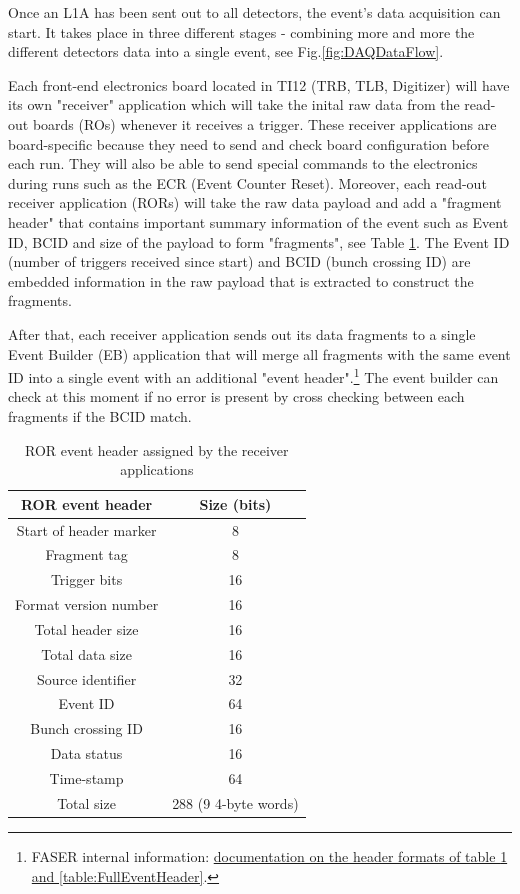 Once an L1A has been sent out to all detectors, the event's data acquisition can start. It takes place in three different stages - combining more and more the different detectors data into a single event, see Fig.\ref{fig:DAQDataFlow}.

Each front-end electronics board located in TI12 (TRB, TLB, Digitizer) will have its own "receiver" application which will take the inital raw data from the read-out boards (ROs) whenever it receives a trigger. These receiver applications are board-specific because they need to send and check board configuration before each run. They will also be able to send special commands to the electronics during runs such as the ECR (Event Counter Reset). Moreover, each read-out receiver application (RORs) will take the raw data payload and add a  "fragment header" that contains important summary information of the event such as Event ID, BCID and size of the payload to form "fragments", see Table \ref{table:RORHeader}. The Event ID (number of triggers received since start) and BCID (bunch crossing ID) are embedded information in the raw payload that is extracted to construct the fragments.

After that, each receiver application sends out its data fragments to a single Event Builder (EB) application that will merge all fragments with the same event ID into a single event with an additional "event header".\footnote{FASER internal information: \href{https://espace.cern.ch/faser-share/Shared\%20Documents/Trigger,\%20DAQ\%20and\%20DCS/FASER_Event_Format.pdf}{ documentation on the header formats of table \ref{table:RORHeader} and \ref{table:FullEventHeader}}.} The event builder can check at this moment if no error is present by cross checking between each fragments if the BCID match.



\begin{table}[htbp!] 
\caption{ROR event header assigned by the receiver applications}
\centering
\label{table:RORHeader}
\begin{tabular}{c c}
\toprule
ROR event header & Size (bits) \\
\midrule
Start of header marker & 8\\
Fragment tag & 8\\
Trigger bits & 16\\
Format version number & 16\\
Total header size & 16\\
Total data size & 16\\
Source identifier & 32\\
Event ID & 64\\
Bunch crossing ID & 16\\
Data status & 16\\
Time-stamp & 64\\
\midrule
Total size & 288 (9 4-byte words)\\
\bottomrule
\end{tabular}
\end{table}


